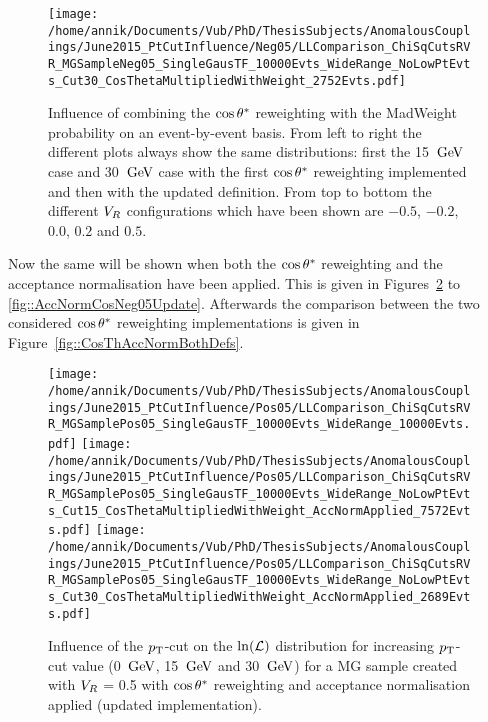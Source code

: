 \begin{figure}[h!t]
 \texttt{[image: /home/annik/Documents/Vub/PhD/ThesisSubjects/AnomalousCouplings/June2015\_PtCutInfluence/Neg05/LLComparison\_ChiSqCutsRVR\_MGSampleNeg05\_SingleGausTF\_10000Evts\_WideRange\_NoLowPtEvts\_Cut30\_CosThetaMultipliedWithWeight\_2752Evts.pdf]}
 \caption{Influence of combining the $\cos \theta^{*}$ reweighting with the MadWeight probability on an event-by-event basis. From left to right the different plots always show the same distributions: first the 15 $\, \mathrm{GeV}$ case and 30 $\, \mathrm{GeV}$ case with the first $\cos \theta^{*}$ reweighting implemented and then with the updated definition. From top to bottom the different $V_{R}$ configurations which have been shown are $-0.5$, $-0.2$, $0.0$, $0.2$ and $0.5$.}
 \label{fig::CosThInflBothDefs}
 \end{figure}

Now the same will be shown when both the $\cos \theta^{*}$ reweighting and the acceptance normalisation have been applied. This is given in Figures~\ref{fig::AccNormCosPos05Update} to \ref{fig::AccNormCosNeg05Update}. Afterwards the comparison between the two considered $\cos \theta^{*}$ reweighting implementations is given in Figure~\ref{fig::CosThAccNormBothDefs}.

\begin{figure}[h!t]
 \centering
 \texttt{[image: /home/annik/Documents/Vub/PhD/ThesisSubjects/AnomalousCouplings/June2015\_PtCutInfluence/Pos05/LLComparison\_ChiSqCutsRVR\_MGSamplePos05\_SingleGausTF\_10000Evts\_WideRange\_10000Evts.pdf]}
 \texttt{[image: /home/annik/Documents/Vub/PhD/ThesisSubjects/AnomalousCouplings/June2015\_PtCutInfluence/Pos05/LLComparison\_ChiSqCutsRVR\_MGSamplePos05\_SingleGausTF\_10000Evts\_WideRange\_NoLowPtEvts\_Cut15\_CosThetaMultipliedWithWeight\_AccNormApplied\_7572Evts.pdf]}
 \texttt{[image: /home/annik/Documents/Vub/PhD/ThesisSubjects/AnomalousCouplings/June2015\_PtCutInfluence/Pos05/LLComparison\_ChiSqCutsRVR\_MGSamplePos05\_SingleGausTF\_10000Evts\_WideRange\_NoLowPtEvts\_Cut30\_CosThetaMultipliedWithWeight\_AccNormApplied\_2689Evts.pdf]}
 \caption{Influence of the $p_{\textrm T}$-cut on the $\ln(\mathcal{L})$ distribution for increasing $p_{\textrm T}$-cut value (0 $\, \mathrm{GeV}$, 15 $\, \mathrm{GeV}$ and 30 $\, \mathrm{GeV}$) for a MG sample created with $V_{R}$ = 0.5 with $\cos \theta^{*}$ reweighting and acceptance normalisation applied (updated implementation).}
 \label{fig::AccNormCosPos05Update}
\end{figure}

